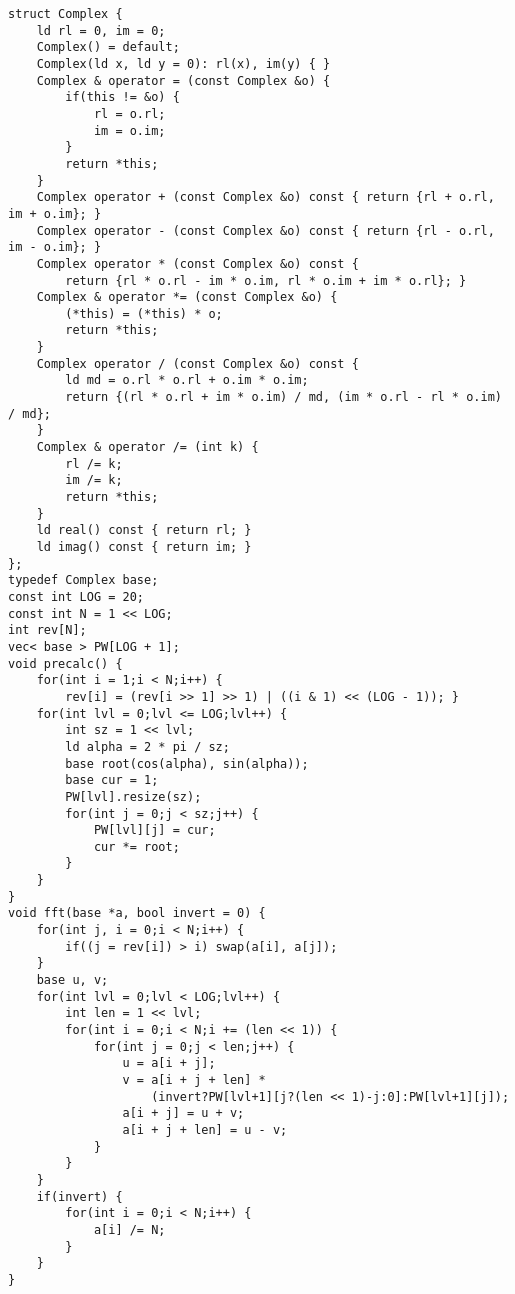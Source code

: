 \documentclass[12pt]{article}
\begin{document}
\begin{verbatim}
struct Complex {
    ld rl = 0, im = 0;
    Complex() = default;
    Complex(ld x, ld y = 0): rl(x), im(y) { }
    Complex & operator = (const Complex &o) {
        if(this != &o) {
            rl = o.rl;
            im = o.im;
        }
        return *this;
    }
    Complex operator + (const Complex &o) const { return {rl + o.rl, im + o.im}; }
    Complex operator - (const Complex &o) const { return {rl - o.rl, im - o.im}; }
    Complex operator * (const Complex &o) const { 
        return {rl * o.rl - im * o.im, rl * o.im + im * o.rl}; }
    Complex & operator *= (const Complex &o) {
        (*this) = (*this) * o;
        return *this;
    }
    Complex operator / (const Complex &o) const {
        ld md = o.rl * o.rl + o.im * o.im;
        return {(rl * o.rl + im * o.im) / md, (im * o.rl - rl * o.im) / md};
    }
    Complex & operator /= (int k) {
        rl /= k;
        im /= k;
        return *this;
    }
    ld real() const { return rl; }
    ld imag() const { return im; }
};
typedef Complex base;
const int LOG = 20;
const int N = 1 << LOG;
int rev[N];
vec< base > PW[LOG + 1];
void precalc() {
    for(int i = 1;i < N;i++) { 
        rev[i] = (rev[i >> 1] >> 1) | ((i & 1) << (LOG - 1)); }
    for(int lvl = 0;lvl <= LOG;lvl++) {
        int sz = 1 << lvl;
        ld alpha = 2 * pi / sz;
        base root(cos(alpha), sin(alpha));
        base cur = 1;
        PW[lvl].resize(sz);
        for(int j = 0;j < sz;j++) {
            PW[lvl][j] = cur;
            cur *= root;
        }
    }
}
void fft(base *a, bool invert = 0) {
    for(int j, i = 0;i < N;i++) {
        if((j = rev[i]) > i) swap(a[i], a[j]);
    }
    base u, v;
    for(int lvl = 0;lvl < LOG;lvl++) {
        int len = 1 << lvl;
        for(int i = 0;i < N;i += (len << 1)) {
            for(int j = 0;j < len;j++) {
                u = a[i + j];
                v = a[i + j + len] * 
                    (invert?PW[lvl+1][j?(len << 1)-j:0]:PW[lvl+1][j]);
                a[i + j] = u + v;
                a[i + j + len] = u - v;
            }
        }
    }
    if(invert) {
        for(int i = 0;i < N;i++) {
            a[i] /= N;
        }
    }
}
\end{verbatim}
\end{document}
